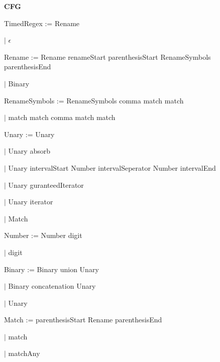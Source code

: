 
\textbf{CFG}

TimedRegex := Rename

\qquad	$\mid$ $\epsilon$

Rename := Rename renameStart parenthesisStart RenameSymbols parenthesisEnd

\qquad $\mid$ Binary

RenameSymbols := RenameSymbols comma match match

\qquad $\mid$ match match comma match match

Unary := Unary

\qquad $\mid$ Unary absorb

\qquad $\mid$ Unary intervalStart Number intervalSeperator Number intervalEnd

\qquad $\mid$ Unary guranteedIterator

\qquad $\mid$ Unary iterator

\qquad $\mid$ Match

Number := Number digit

\qquad $\mid$ digit

Binary := Binary union Unary

\qquad $\mid$ Binary concatenation Unary

\qquad $\mid$ Unary

Match := parenthesisStart Rename parenthesisEnd

\qquad $\mid$ match

\qquad $\mid$ matchAny

